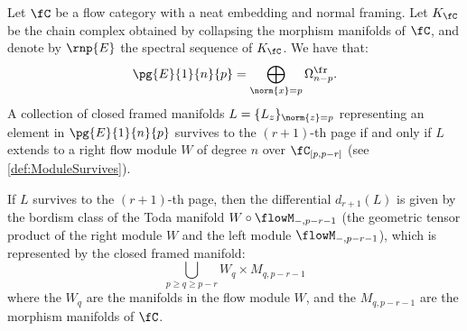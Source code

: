 \begin{thm}\label{cor:SSofFFCat}
    Let $\fC$ be a flow category with a neat embedding and normal framing. Let $K_{\fC}$ be the chain complex obtained by collapsing the morphism manifolds of $\fC$, and denote by $\rnp{E}$ the spectral sequence of $K_{\fC}$. We have that:
    \begin{equation*}
        \pg{E}{1}{n}{p}=\bigoplus_{\norm{x}=p} \Omega^{\fr}_{n-p}.
    \end{equation*}
    A collection of closed framed manifolds $L = \{L_z\}_{\norm{z}=p}$ representing an element in $\pg{E}{1}{n}{p}$ survives to the $(r+1)$-th page if and only if $L$ extends to a right flow module $W$ of degree $n$ over $\fC_{[p, p-r]}$ (see \cref{def:ModuleSurvives}).
    
    If $L$ survives to the $(r+1)$-th page, then the differential $d_{r+1}(L)$ is given by the bordism class of the Toda manifold $W \circ \flowM_{-, p-r-1}$ (the geometric tensor product of the right module $W$ and the left module $\flowM_{-, p-r-1}$), which is represented by the closed framed manifold:
    \begin{equation*}
        \bigcup_{p \geq q \geq p-r} W_q \times M_{q, p-r-1}
    \end{equation*}
    where the $W_q$ are the manifolds in the flow module $W$, and the $M_{q, p-r-1}$ are the morphism manifolds of $\fC$.
\end{thm}
